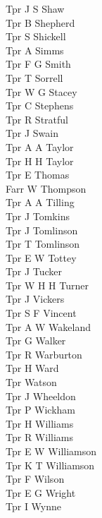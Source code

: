 \begin{multicols}{2}
  Tpr J S Shaw \\
  Tpr B Shepherd \\
  Tpr S Shickell \\
  Tpr A Simms \\
  Tpr F G Smith \\
  Tpr T Sorrell \\
  Tpr W G Stacey \\
  Tpr C Stephens \\
  Tpr R Stratful \\
  Tpr J Swain \\
  Tpr A A Taylor \\
  Tpr H H Taylor \\
  Tpr E Thomas \\
  Farr W Thompson \\
  Tpr A A Tilling \\
  Tpr J Tomkins \\
  Tpr J Tomlinson \\
  Tpr T Tomlinson \\
  Tpr E W Tottey \\
  Tpr J Tucker \\
  Tpr W H H Turner \\
  Tpr J Vickers \\
  Tpr S F Vincent \\
  Tpr A W Wakeland \\
  Tpr G Walker \\
  Tpr R Warburton \\
  Tpr H Ward \\
  Tpr Watson \\
  Tpr J Wheeldon \\
  Tpr P Wickham \\
  Tpr H Williams \\
  Tpr R Williams \\
  Tpr E W Williamson \\
  Tpr K T Williamson \\
  Tpr F Wilson \\
  Tpr E G Wright \\
  Tpr I Wynne \\
\end{multicols}
